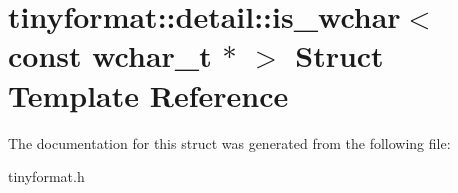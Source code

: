 \hypertarget{structtinyformat_1_1detail_1_1is__wchar_3_01const_01wchar__t_01_5_01_4}{}\section{tinyformat\+:\+:detail\+:\+:is\+\_\+wchar$<$ const wchar\+\_\+t $\ast$ $>$ Struct Template Reference}
\label{structtinyformat_1_1detail_1_1is__wchar_3_01const_01wchar__t_01_5_01_4}


The documentation for this struct was generated from the following file\+:\begin{DoxyCompactItemize}
\item 
tinyformat.\+h\end{DoxyCompactItemize}
